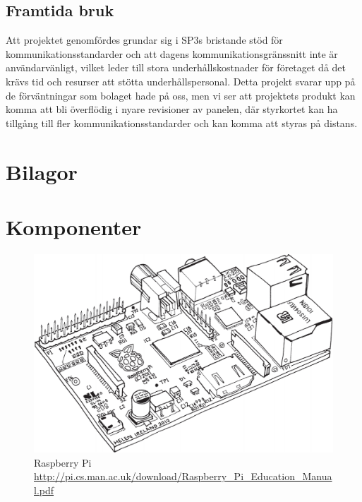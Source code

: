 \documentclass{article}
\begin{document}
        \subsection{Framtida bruk} %
        \label{sub:framtida_bruk}
            Att projektet genomfördes grundar sig i SP3s bristande stöd för kommunikationsstandarder och att dagens kommunikationsgränssnitt inte är användarvänligt, vilket leder till stora underhållskostnader för företaget då det krävs tid och resurser att stötta underhålls\-personal. Detta projekt svarar upp på de förväntningar som bolaget hade på oss, men vi ser att projektets produkt kan komma att bli överflödig i nyare revisioner av panelen, där styrkortet kan ha tillgång till fler kommunikationsstandarder och kan komma att styras på distans.

    \newpage

    \clearpage
    \printbibliography      
    \newpage
    \section{Bilagor} %
    \label{sec:appendix}
    \appendix
        \section{Komponenter} %
        \label{sec:komp}
                \begin{figure}[h!]
                  \centering
                    \includegraphics[scale=0.4]{img/rpi}
                  \caption{Raspberry Pi \\ \url{http://pi.cs.man.ac.uk/download/Raspberry_Pi_Education_Manual.pdf}}
                  \label{fig:raspberry}
                \end{figure}
\end{document}

